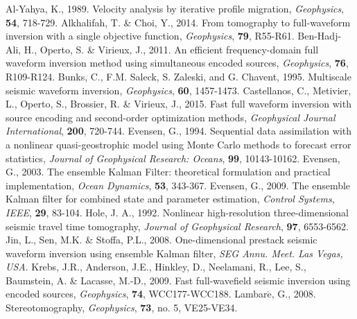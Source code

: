 \documentclass[mreferee]{gji}
\begin{document}
\begin{thebibliography}{}
 Al-Yahya, K., 1989. Velocity analysis by iterative profile migration, \textit{Geophysics}, \textbf{54}, 718-729.
   Alkhalifah, T. \& Choi, Y., 2014. From tomography to full-waveform inversion with a single objective function, \textit{Geophysics}, \textbf{79}, R55-R61.
   Ben-Hadj-Ali, H., Operto, S. \& Virieux, J., 2011. An efficient frequency-domain full waveform inversion method using simultaneous encoded sources, \textit{Geophysics}, \textbf{76}, R109-R124.
 Bunks, C., F.M. Saleck, S. Zaleski, and G. Chavent, 1995. Multiscale seismic waveform inversion,  \textit{Geophysics}, \textbf{60}, 1457-1473.
    Castellanos, C., Metivier, L., Operto, S., Brossier, R. \& Virieux, J., 2015. Fast full waveform inversion with source encoding and second-order optimization methods, \textit{Geophysical Journal International}, \textbf{200}, 720-744.
    Evensen, G., 1994. Sequential data assimilation with a nonlinear quasi-geostrophic model using Monte Carlo methods to forecast error statistics, \textit{Journal of Geophysical Research: Oceans}, \textbf{99}, 10143-10162.
   Evensen, G., 2003. The ensemble Kalman Filter: theoretical formulation and practical implementation, \textit{Ocean Dynamics}, \textbf{53}, 343-367.
   Evensen, G., 2009. The ensemble Kalman filter for combined state and parameter estimation, \textit{Control Systems, IEEE}, \textbf{29}, 83-104.
 Hole, J. A., 1992. Nonlinear high-resolution three-dimensional seismic travel time tomography, \textit{Journal of Geophysical Research}, \textbf{97}, 6553-6562.
 Jin, L., Sen, M.K. \& Stoffa, P.L., 2008. One-dimensional prestack seismic waveform inversion using ensemble Kalman filter, \textit{SEG Annu. Meet. Las Vegas, USA}.
   Krebs, J.R., Anderson, J.E., Hinkley, D., Neelamani, R., Lee, S., Baumstein, A. \& Lacasse, M.-D., 2009. Fast full-wavefield seismic inversion using encoded sources, \textit{Geophysics}, \textbf{74}, WCC177-WCC188.
   Lambar$\acute{\textrm{e}}$, G., 2008. Stereotomography, \textit{Geophysics}, \textbf{73}, no. 5, VE25-VE34.

\end{thebibliography}
\end{document}
